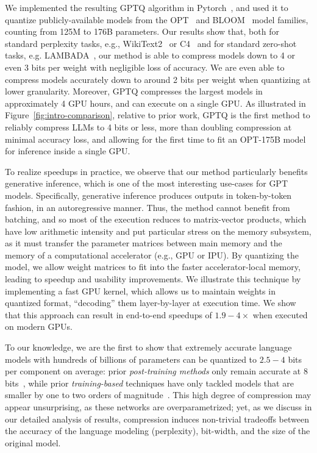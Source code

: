 We implemented the resulting GPTQ algorithm in Pytorch~\cite{paszke2019pytorch}, and used it to quantize publicly-available models from the OPT~\cite{zhang2022opt} and BLOOM~\cite{laurencconbigscience} model families, counting from 125M to 176B parameters. Our results show that, both for standard perplexity tasks, e.g., WikiText2~\cite{wikitext103} or C4~\cite{C4} and for standard zero-shot tasks, e.g. LAMBADA~\cite{paperno2016lambada}, our method is able to compress models down to 4 or even 3 bits per weight with negligible loss of accuracy. We are even able to compress models accurately down to around 2 bits per weight when quantizing at lower granularity. Moreover, GPTQ compresses the largest models in approximately 4 GPU hours, and can execute on a single GPU. As illustrated in Figure~\ref{fig:intro-comparison}, relative to prior work, GPTQ is the first method to reliably compress LLMs to 4 bits or less, more than doubling compression at minimal accuracy loss, and allowing for the first time to fit an OPT-175B model for inference inside a single GPU.

To realize speedups in practice, we observe that our method particularly benefits generative inference, which is one of the most interesting use-cases for GPT models. Specifically, generative inference produces outputs in token-by-token fashion, in an autoregressive manner. Thus, the method cannot benefit from batching, and so most of the execution reduces to matrix-vector products, which have low arithmetic intensity and put particular stress on the memory subsystem, as it must transfer the parameter matrices between main memory and the memory of a computational accelerator (e.g., GPU or IPU). By quantizing the model, we allow weight matrices to fit into the faster accelerator-local memory, leading to speedup and usability improvements. We illustrate this technique by implementing a fast  GPU kernel, which allows us to maintain weights in quantized format, ``decoding'' them layer-by-layer at execution time. We show that this approach can result in end-to-end speedups of $1.9 - 4\times$ when executed on modern GPUs. 

To our knowledge, we are the first to show that extremely accurate language models with hundreds of billions of parameters can be quantized to $2.5 - 4$ bits per component on average: prior \emph{post-training methods} only remain accurate at 8 bits~\cite{yao2022zeroquant, dettmers2022llm}, while prior \emph{training-based} techniques have only tackled  models that are smaller by one to two orders of magnitude~\cite{wu2022extreme, tao2022compression}. This high degree of compression may appear unsurprising, as these networks are overparametrized; yet, as we discuss in our detailed analysis of results, compression induces non-trivial tradeoffs between the accuracy of the language modeling (perplexity), bit-width, and the size of the original model.

